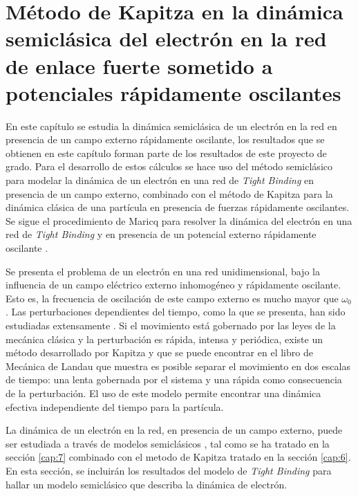 \chapter{Método de Kapitza en la dinámica semiclásica del electrón en la red de enlace fuerte sometido a potenciales rápidamente oscilantes}\label{cap:9} 

En este capítulo se estudia la dinámica semiclásica de un electrón en la red en presencia de un campo externo rápidamente oscilante, los resultados que se obtienen en este capítulo forman parte de los resultados de este proyecto de grado. Para el desarrollo de estos cálculos se hace uso del método semiclásico para modelar la dinámica de un electrón en una red de \textit{Tight Binding} en presencia de un campo externo, combinado con el método de Kapitza para la dinámica clásica de una partícula en presencia de fuerzas rápidamente oscilantes. Se sigue el procedimiento de Maricq para resolver la dinámica del electrón en una red de \textit{Tight Binding} y en presencia de un potencial externo rápidamente oscilante \cite{maricq}\cite{mart2014}.


Se presenta el problema de un electrón en una red unidimensional, bajo la influencia de un campo eléctrico externo inhomogéneo y rápidamente oscilante. Esto es, la frecuencia de oscilación de este campo externo es mucho mayor que $\omega_{0}$. Las perturbaciones dependientes del tiempo, como la que se presenta, han sido estudiadas extensamente \cite{Dunlap}\cite{mart2014}. Si el movimiento está gobernado por las leyes de la mecánica clásica y la perturbación es rápida, intensa y periódica, existe un método desarrollado por Kapitza \cite{kapitza} y que se puede encontrar en el libro de Mecánica de Landau \cite{landau} que muestra es posible separar el movimiento en dos escalas de tiempo: una lenta gobernada por el sistema y una rápida como consecuencia de la perturbación. El uso de este modelo permite encontrar una dinámica efectiva independiente del tiempo para la partícula.

La dinámica de un electrón en la red, en presencia de un campo externo, puede ser estudiada a través de modelos semiclásicos \cite{ashc}, tal como se ha tratado en la sección \ref{cap:7} combinado con el metodo de Kapitza tratado en la sección \ref{cap:6}. En esta sección, se incluirán los resultados del modelo de \textit{Tight Binding} para hallar un modelo semiclásico que describa la dinámica de electrón.

